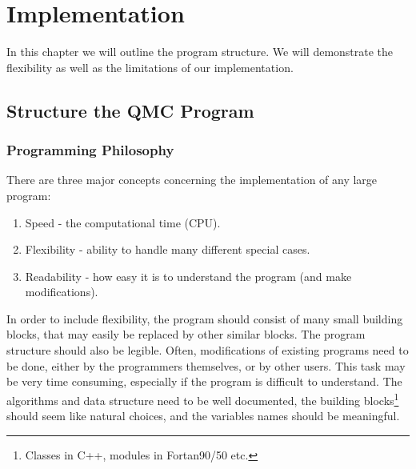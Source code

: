 \chapter{Implementation}

In this chapter we will outline the program structure. We will
demonstrate the flexibility as well as the limitations of our
implementation.


\section{Structure the QMC Program}


\subsection{Programming Philosophy}

There are three major concepts concerning the implementation of any
large program:

\begin{enumerate}
  \item{} Speed - the computational time (CPU).
  \item{} Flexibility - ability to handle many different special cases.
  \item{} Readability - how easy it is to understand the program (and
  make modifications).
\end{enumerate}

In order to include flexibility, the
program should consist of many small building blocks, that may easily
be replaced by other similar blocks. The program structure should also
be legible. Often, modifications of existing programs need to be done,
either by the programmers themselves, or by other users. This task may
be very time consuming, especially if the program is difficult to
understand. The algorithms and data structure 
need to be well documented, the building blocks\footnote{Classes
  in C++, modules in Fortan90/50 etc.} should seem like natural
choices, and the variables names should be meaningful. \newline

